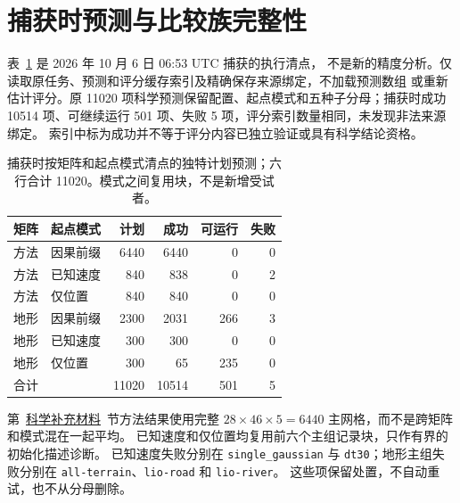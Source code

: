 \clearpage

\section{捕获时预测与比较族完整性}
\label{sec:execution-coverage}\hypertarget{sec:execution-coverage}{}
表~\ref{tab:execution-coverage} 是 2026 年 10 月 6 日 06:53 UTC 捕获的执行清点，
不是新的精度分析。仅读取原任务、预测和评分缓存索引及精确保存来源绑定，不加载预测数组
或重新估计评分。原 11020 项科学预测保留配置、起点模式和五种子分母；捕获时成功
10514 项、可继续运行 501 项、失败 5 项，评分索引数量相同，未发现非法来源绑定。
索引中标为成功并不等于评分内容已独立验证或具有科学结论资格。

\begin{table}[htbp]
\centering\small
\caption{捕获时按矩阵和起点模式清点的独特计划预测；六行合计 11020。模式之间复用块，不是新增受试者。}
\label{tab:execution-coverage}\hypertarget{tab:execution-coverage}{}
\begin{tabular}{@{}llrrrr@{}}
\toprule
矩阵 & 起点模式 & 计划 & 成功 & 可运行 & 失败\\
\midrule
方法 & 因果前缀 & 6440 & 6440 & 0 & 0\\
方法 & 已知速度 & 840 & 838 & 0 & 2\\
方法 & 仅位置 & 840 & 840 & 0 & 0\\
地形 & 因果前缀 & 2300 & 2031 & 266 & 3\\
地形 & 已知速度 & 300 & 300 & 0 & 0\\
地形 & 仅位置 & 300 & 65 & 235 & 0\\
\midrule
合计 & & 11020 & 10514 & 501 & 5\\
\bottomrule
\end{tabular}
\end{table}

第~\href{supplement.pdf\#sec:method-results}{科学补充材料}~节方法结果使用完整 $28\times46\times5=6440$ 主网格，而不是跨矩阵和模式混在一起平均。
已知速度和仅位置均复用前六个主组记录块，只作有界的初始化描述诊断。
已知速度失败分别在 \texttt{single\_gaussian} 与 \texttt{dt30}；地形主组失败分别在
\texttt{all-terrain}、\texttt{lio-road} 和 \texttt{lio-river}。
这些项保留处置，不自动重试，也不从分母删除。

